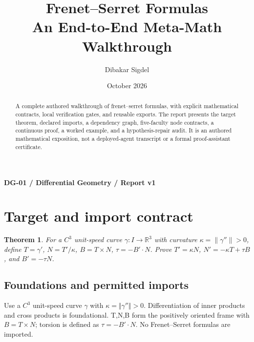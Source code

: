 \documentclass[preprint,12pt,aps,pra,showkeys,amsmath,amssymb,superscriptaddress,floatfix]{revtex4-2}
\newtheorem{theorem}{Theorem}[section]
\theoremstyle{definition}
\theoremstyle{remark}
\begin{document}
\title{Frenet--Serret Formulas\\[4pt]\large An End-to-End Meta-Math Walkthrough}

\author{Dibakar Sigdel}


\date{October 2026}

\begin{abstract}

A complete authored walkthrough of frenet--serret formulas, with
explicit mathematical contracts, local verification gates, and reusable
exports. The report presents the target theorem, declared imports, a
dependency graph, five-faculty node contracts, a continuous proof, a
worked example, and a hypothesis-repair audit. It is an authored
mathematical exposition, not a deployed-agent transcript or a formal
proof-assistant certificate.

\end{abstract}\maketitle\linespread{1.12}\selectfont

\noindent\textbf{DG-01 / Differential Geometry / Report v1}

\section{Target and import contract}

\begin{theorem}

For a \(C^3\) unit-speed curve \(\gamma:I\to\mathbb R^3\) with curvature
\(\kappa=\|\gamma''\|>0\), define \(T=\gamma'\), \(N=T'/\kappa\),
\(B=T\times N\), \(\tau=-B'\cdot N\). Prove \(T'=\kappa N\),
\(N'=-\kappa T+\tau B\), and \(B'=-\tau N\).

\end{theorem}

\subsection{Foundations and permitted imports}

Use a \(C^{3}\) unit-speed curve \(\gamma\) with
\(\kappa =\Vert \gamma ''\Vert >0\). Differentiation of inner products
and cross products is foundational. T,N,B form the positively oriented
frame with \(B=T\times N\); torsion is defined as \(\tau =-B'\cdot N\).
No Frenet--Serret formulas are imported.
\end{document}
